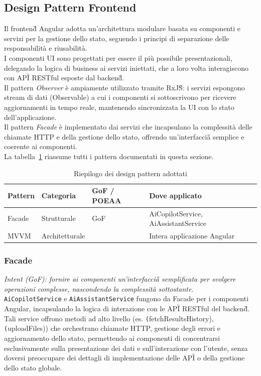 \documentclass[a4paper,11pt]{article}
\newcommand{\code}[1]{\texttt{#1}}
\newcommand{\pattern}[1]{\textit{#1}}
\begin{document}
\subsection{Design Pattern Frontend}
Il frontend\G{} Angular adotta un'architettura modulare basata su componenti e servizi per la gestione dello stato, seguendo i principi di separazione delle responsabilità e riusabilità.\\
I componenti UI sono progettati per essere il più possibile presentazionali, delegando la logica di business ai servizi iniettati, che a loro volta interagiscono con API\G{} RESTful esposte dal backend\G{}.\\
Il pattern \pattern{Observer} è ampiamente utilizzato tramite RxJS\G{}: i servizi espongono stream di dati (Observable) a cui i componenti si sottoscrivono per ricevere aggiornamenti in tempo reale, mantenendo sincronizzata la UI con lo stato dell'applicazione.\\
Il pattern \pattern{Facade} è implementato dai servizi che incapsulano la complessità delle chiamate HTTP e della gestione dello stato, offrendo un'interfaccia\G{} semplice e coerente ai componenti.\\

\noindent La tabella~\ref{tab:pattern_riepilogo} riassume tutti i pattern
documentati in questa sezione.

\begin{table}[H]
\centering
\small
\renewcommand{\arraystretch}{1.3}
\begin{tabularx}{\textwidth}{lllX}
\toprule
\textbf{Pattern} & \textbf{Categoria} & \textbf{GoF / POEAA} & \textbf{Dove applicato} \\
\midrule
Facade    & Strutturale     & GoF      & AiCopilotService, AiAssistantService \\
MVVM                 & Architetturale  &       & Intera applicazione Angular\\
\bottomrule
\end{tabularx}
\caption{Riepilogo dei design pattern adottati}
\label{tab:pattern_riepilogo}
\end{table}
\subsubsection{Facade}
\textit{Intent (GoF): fornire ai componenti un'interfaccia\G{} semplificata per svolgere operazioni complesse, nascondendo la complessità sottostante.}\\
\code{AiCopilotService} e \code{AiAssistantService} fungono da Facade per i componenti Angular, incapsulando la logica di interazione con le API\G{} RESTful del backend\G{}.\\
Tali service offrono metodi ad alto livello (es. \code(fetchResultsHistory), \code(uploadFiles)) che orchestrano chiamate HTTP, gestione degli errori e aggiornamento dello stato, permettendo ai componenti di concentrarsi esclusivamente sulla presentazione dei dati e sull'interazione con l'utente, senza doversi preoccupare dei dettagli di implementazione delle API\G{} o della gestione dello stato globale.
\end{document}

